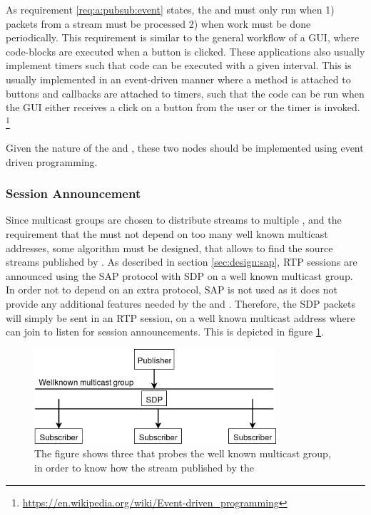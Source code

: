 As requirement \ref{req:a:pubsub:event} states, the \pubs{} and \subs{} must only run when 1) packets from a stream must be processed  2) when work must be done periodically. This requirement is similar to the general workflow of a \ac{GUI}, where code-blocks are executed when a button is clicked. These applications also usually implement timers such that code can be executed with a given interval. This is usually implemented in an event-driven manner where a method is attached to buttons and callbacks are attached to timers, such that the code can be run when the GUI either receives a click on a button from the user or the timer is invoked. \footnote{\url{https://en.wikipedia.org/wiki/Event-driven_programming}}

Given the nature of the \pubs{} and \subs{}, these two nodes should be implemented using event driven programming.


\subsubsection{Session Announcement} \label{sec:design:sessionannouncement}
Since multicast groups are chosen to distribute streams to multiple \subs, and the requirement that the \sub{} must not depend on too many well known multicast addresses, some algorithm must be designed, that allows \subs{} to find the source streams published by \pubs. As described in section \ref{sec:design:sap}, RTP sessions are announced using the SAP protocol with SDP on a well known multicast group. In order not to depend on an extra protocol, SAP is not used as it does not provide any additional features needed by the \pubs{} and \subs{}. Therefore, the SDP packets will simply be sent in an RTP session, on a well known multicast address where \subs{} can join to listen for session announcements. This is depicted in figure \ref{fig:design:pubsub:session_probe}.

\begin{figure}[H]
	\centering
	\includegraphics[width=0.8\textwidth]{figures/session-announcement-probe}
	\caption{The figure shows three \subs{} that probes the well known multicast group, in order to know how the stream published by the \pub{}} \label{fig:design:pubsub:session_probe}
\end{figure}

